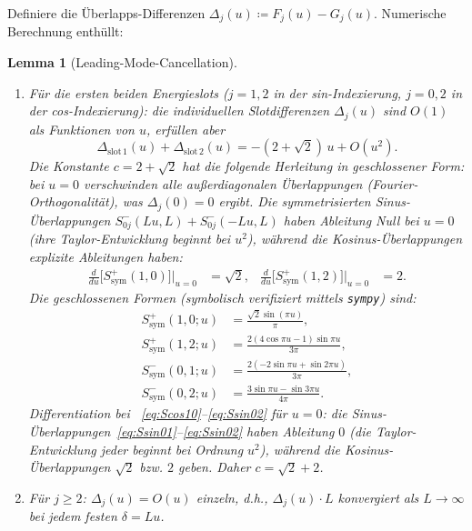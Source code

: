 ﻿\documentclass[12pt,a4paper]{article}
\newtheorem{lemma}[theorem]{Lemma}
\theoremstyle{definition}
\theoremstyle{remark}
\begin{document}
Definiere die Überlapps-Differenzen $\Delta_j(u) \coloneqq F_j(u) - G_j(u)$. Numerische Berechnung enthüllt:

\begin{lemma}[Leading-Mode-Cancellation]
\label{lem:leading-cancel}
\begin{enumerate}[label=\textup{(\alph*)}]
  \item Für die ersten beiden Energieslots ($j = 1, 2$ in der sin-Indexierung, $j = 0, 2$ in der cos-Indexierung): die individuellen Slotdifferenzen $\Delta_j(u)$ sind $O(1)$ als Funktionen von $u$, erfüllen aber
  \begin{equation}
  \label{eq:pairwise-cancel}
    \Delta_{\mathrm{slot\,1}}(u) + \Delta_{\mathrm{slot\,2}}(u) = -(2 + \sqrt{2})\,u + O(u^2).
  \end{equation}
  Die Konstante $c = 2 + \sqrt{2}$ hat die folgende Herleitung in geschlossener Form: bei $u = 0$ verschwinden alle außerdiagonalen Überlappungen (Fourier-Orthogonalität), was $\Delta_j(0) = 0$ ergibt. Die symmetrisierten Sinus-Überlappungen $S^-_{0j}(Lu, L) + S^-_{0j}(-Lu, L)$ haben \emph{Ableitung Null} bei $u = 0$ (ihre Taylor-Entwicklung beginnt bei $u^2$), während die Kosinus-Überlappungen explizite Ableitungen haben:
  \begin{align*}
    \frac{d}{du}\bigl[S^+_{\mathrm{sym}}(1, 0)\bigr]\Big|_{u=0} &= \sqrt{2}, &
    \frac{d}{du}\bigl[S^+_{\mathrm{sym}}(1, 2)\bigr]\Big|_{u=0} &= 2.
  \end{align*}
  Die geschlossenen Formen (symbolisch verifiziert mittels \texttt{sympy}) sind:
  \begin{align}
    S^+_{\mathrm{sym}}(1,0;u) &= \frac{\sqrt{2}\sin(\pi u)}{\pi}, \label{eq:Scos10} \\
    S^+_{\mathrm{sym}}(1,2;u) &= \frac{2(4\cos\pi u - 1)\sin\pi u}{3\pi}, \label{eq:Scos12} \\
    S^-_{\mathrm{sym}}(0,1;u) &= \frac{2(-2\sin\pi u + \sin 2\pi u)}{3\pi}, \label{eq:Ssin01} \\
    S^-_{\mathrm{sym}}(0,2;u) &= \frac{3\sin\pi u - \sin 3\pi u}{4\pi}. \label{eq:Ssin02}
  \end{align}
  Differentiation bei ~\eqref{eq:Scos10}--\eqref{eq:Ssin02} für $u = 0$: die Sinus-Überlappungen~\eqref{eq:Ssin01}--\eqref{eq:Ssin02} haben Ableitung $0$ (die Taylor-Entwicklung jeder beginnt bei Ordnung $u^2$), während die Kosinus-Überlappungen $\sqrt{2}$ bzw. $2$ geben. Daher $c = \sqrt{2} + 2$.
  \item Für $j \geq 2$: $\Delta_j(u) = O(u)$ einzeln, d.h., $\Delta_j(u) \cdot L$ konvergiert als $L \to \infty$ bei jedem festen $\delta = Lu$.
\end{enumerate}
\end{lemma}
\end{document}
